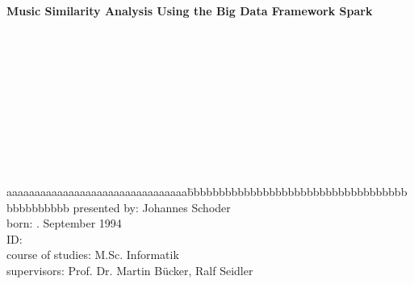 \documentclass[a4paper,oneside,12pt]{report}
\makeatletter
\newcommand\frontmatter{%
    \cleardoublepage
  \pagenumbering{roman}}
\makeatother
\begin{document}
\begin{center}
\end{center}
\begin{center}
\begin{Large}
\textbf{Music Similarity Analysis Using the Big Data Framework Spark}
\end{Large}
\end{center}
\ \\
\ \\
\ \\
\ \\
\ \\
\ \\
\ \\
\ \\
\ \\
\flushleft
\begin{tabbing}
aaaaaaaaaaaaaaaaaaaaaaaaaaaaaaaa\= bbbbbbbbbbbbbbbbbbbbbbbbbbbbbbbbbbbbbbbbbbbbb\kill
presented by: \>Johannes Schoder\\
born: . September 1994\\
ID: \\
course of studies: \>M.Sc. Informatik\\
supervisors: \> Prof. Dr. Martin B\"ucker, Ralf Seidler\\
\end{tabbing}




\frontmatter %
\pagestyle{plain} %



\newpage
\tableofcontents%
\pagestyle{plain} 

\end{document}
